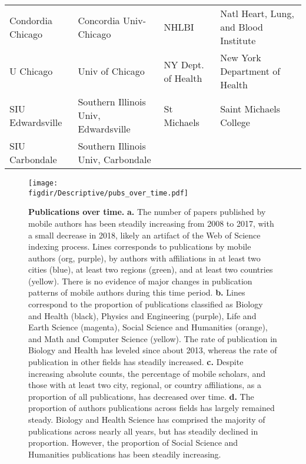 \documentclass[12pt]{article} %
\def\figdir{../Figs}
\begin{document}
\begin{table}[ht]
\begin{adjustwidth}{-2cm}{}
\begin{tabular}{llll}
  Condordia Chicago & Concordia Univ-Chicago & NHLBI & Natl Heart, Lung, and Blood Institute \\ 
  U Chicago & Univ of Chicago & NY Dept. of Health & New York Department of Health \\ 
  SIU Edwardsville & Southern Illinois Univ, Edwardsville & St Michaels & Saint Michaels College \\ 
  SIU Carbondale & Southern Illinois Univ, Carbondale &  &  \\ 
   \hline
\end{tabular}
\endgroup
\end{adjustwidth}
\end{table}


\newpage
%
%
\begin{figure}[p!]
	\centering
	\texttt{[image: \\figdir/Descriptive/pubs\_over\_time.pdf]}
	\caption{
		\textbf{Publications over time.}
		\textbf{a.}
		The number of papers published by mobile authors has been steadily increasing from 2008 to 2017, with a small decrease in 2018,  likely an artifact of the Web of Science indexing process.
		Lines corresponds to publications by mobile authors (org, purple), by authors with affiliations in at least two cities (blue), at least two regions (green), and at least two countries (yellow).
		There is no evidence of major changes in publication patterns of mobile authors during this time period.
		\textbf{b.}
		Lines correspond to the proportion of publications classified as Biology and Health (black), Physics and Engineering (purple), Life and Earth Science (magenta), Social Science and Humanities (orange), and Math and Computer Science (yellow).
		The rate of publication in Biology and Health has leveled since about 2013, whereas the rate of publication in other fields has steadily increased.
		\textbf{c.}
		Despite increasing absolute counts, the percentage of mobile scholars, and those with at least two city, regional, or country affiliations, as a proportion of all publications, has decreased over time.
		\textbf{d.}
		The proportion of authors publications across fields has largely remained steady.
		Biology and Health Science has comprised the majority of publications across nearly all years, but has steadily declined in proportion.
		However, the proportion of Social Science and Humanities publications has been steadily increasing.
	}
	\label{fig:supp:pubs_over_time}
\end{figure}
\end{document}
